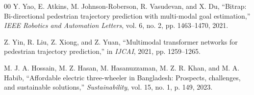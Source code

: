 \documentclass[12pt, a4paper]{article}
\begin{document}
\begin{thebibliography}{00}
Y. Yao, E. Atkins, M. Johnson-Roberson, R. Vasudevan, and X. Du, ``Bitrap: Bi-directional pedestrian trajectory prediction with multi-modal goal estimation,'' \textit{IEEE Robotics and Automation Letters}, vol. 6, no. 2, pp. 1463–1470, 2021.

Z. Yin, R. Liu, Z. Xiong, and Z. Yuan, ``Multimodal transformer networks for pedestrian trajectory prediction,'' in \textit{IJCAI}, 2021, pp. 1259–1265.

M. J. A. Hossain, M. Z. Hasan, M. Hasanuzzaman, M. Z. R. Khan, and M. A. Habib, ``Affordable electric three-wheeler in Bangladesh: Prospects, challenges, and sustainable solutions,'' \textit{Sustainability}, vol. 15, no. 1, p. 149, 2023.

\end{thebibliography}
\end{document}
